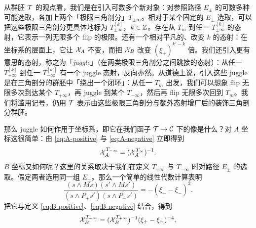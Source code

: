 从群胚 $\mathcal{T}$ 的观点看，我们是在引入可数多个新对象：对参照路径 $E_\pm$ 的可数多种可能选取，各加上两个「极限三角剖分」$T_{\pm\infty}$。相对于某个固定的 $E_\pm$ 选取，可以把这些极限三角剖分更具体地标为 $T_{\pm\infty}^{[k]}$，$k\in\mathbb{Z}$。存在从 $T_m$ 到任一 $T_{\pm\infty}^{[k]}$ 的态射，它表示一列无限多个 flip 的极限。还有一个相对平凡的、改变 $k$ 的态射：在坐标系的层面上，它让 $\mathcal{X}_A$ 不变，而把 $\mathcal{X}_B$ 改变 $(\xi_+)^{k'-k}$ 倍。我们还引入更有意思的态射，称之为「\emph{juggle}」（在两类极限三角剖分之间跳接的态射）：从任一 $T^{[k]}_{+\infty}$ 到任一 $T^{[k']}_{-\infty}$ 有一个 juggle 态射，反向亦然。从道德上说，引入这些 juggle 是在三角剖分的群胚中「绕出一个闭环」：从任一 $T_m$ 出发，我们可以想象 flip 无限多次到达某个 $T_{+\infty}$，再 juggle 到某个 $T_{-\infty}$，然后再 flip 无限多次回到 $T_m$。我们将滥用记号，仍用 $\mathcal{T}$ 表示由这些极限三角剖分与额外态射增广后的装饰三角剖分群胚。

那么 juggle 如何作用于坐标系，即它在我们函子 $\mathcal{T}\to\mathcal{C}$ 下的像是什么？对 $A$ 坐标这很简单：由 \eqref{eq:A-positive} 与 \eqref{eq:A-negative} 立即得到
\begin{equation}\label{eq:A-relation}
\CX^{T_{-\infty}}_A = (\CX^{T_{\infty}}_A)^{-1}.%
\end{equation}
$B$ 坐标又如何呢？这里的关系取决于我们在定义 $T_{+\infty}$ 与 $T_{-\infty}$ 时对路径 $E_\pm$ 的选取。假定两者选用同一组 $E_\pm$。那么一个简单的线性代数计算表明
\begin{equation}
\frac{(s\wedge Ms)(s'\wedge Ms')}{(s\wedge P_+ s')(s\wedge P_- s')} = -(\xi_+-\xi_-)^2.
\end{equation}
把它与定义 \eqref{eq:B-positive}、\eqref{eq:B-negative} 结合，得到
\begin{equation}\label{eq:B-relation}
\mathcal{X}^{T_{-\infty}}_B = (\mathcal{X}^{T_{+\infty}}_B)^{-1}(\xi_+-\xi_-)^{-4}.
\end{equation}

